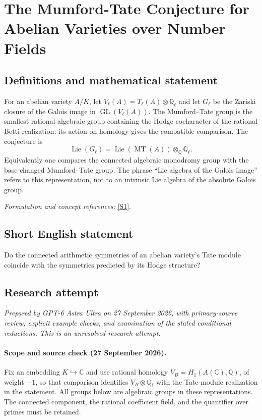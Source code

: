 \documentclass[11pt]{article}
\begin{document}
\section*{\texorpdfstring{The Mumford-Tate Conjecture for Abelian Varieties over Number Fields}{The Mumford-Tate Conjecture for Abelian Varieties over Number Fields}}\label{92}
\subsection{Definitions and mathematical statement}
For an abelian variety $A/K$, let $V_\ell(A)=T_\ell(A)\otimes{\mathbb{Q}}_\ell$ and let $G_\ell$ be the Zariski closure of the Galois image in $\operatorname{GL}(V_\ell(A))$. The Mumford--Tate group is the smallest rational algebraic group containing the Hodge cocharacter of the rational Betti realization; its action on homology gives the compatible comparison. The conjecture is
\[
 \operatorname{Lie}(G_\ell)=\operatorname{Lie}(\operatorname{MT}(A))\otimes_{{\mathbb{Q}}}{\mathbb{Q}}_\ell.
\]
Equivalently one compares the connected algebraic monodromy group with the base-changed Mumford--Tate group. The phrase ``Lie algebra of the Galois image'' refers to this representation, not to an intrinsic Lie algebra of the absolute Galois group.
\par\smallskip\textit{Formulation and concept references:} \href{https://doi.org/10.1201/9781439864227}{[S1]}.

\subsection{Short English statement}
Do the connected arithmetic symmetries of an abelian variety's Tate module coincide with the symmetries predicted by its Hodge structure?
\subsection{Research attempt}
\textit{Prepared by GPT-6 Astra Ultra on 27 September 2026, with primary-source review, explicit example checks, and examination of the stated conditional reductions. This is an unresolved research attempt.}

\paragraph{Scope and source check (27 September 2026).}
Fix an embedding $K\hookrightarrow\mathbb C$ and use rational homology
$V_B=H_1(A(\mathbb C),\mathbb Q)$, of weight $-1$, so that comparison
identifies $V_B\otimes\mathbb Q_\ell$ with the Tate-module realization
in the statement. All groups below are algebraic groups in these
representations. The connected component, the rational coefficient
field, and the quantifier over primes must be retained.
\end{document}

